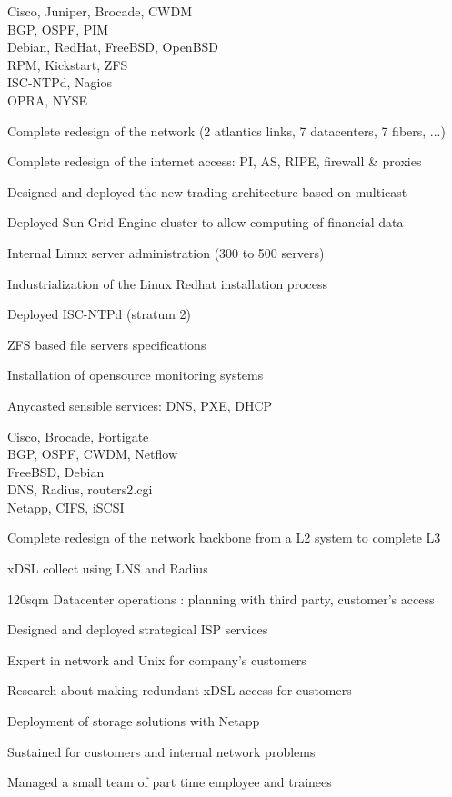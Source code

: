 \documentclass[a4paper,11pt]{cv4tw}%
\begin{document}
	{Cisco, Juniper, Brocade, CWDM\\BGP, OSPF, PIM\\Debian, RedHat, FreeBSD, OpenBSD\\RPM, Kickstart, ZFS\\ISC-NTPd, Nagios\\OPRA, NYSE}
		{
		\begin{missions}
			\item Complete redesign of the network (2 atlantics links, 7 datacenters, 7 fibers, ...)
			\item Complete redesign of the internet access: PI, AS, RIPE, firewall \& proxies
			\item Designed and deployed the new trading architecture based on multicast
			\item Deployed Sun Grid Engine cluster to allow computing of financial data 
			\item Internal Linux server administration (300 to 500 servers)
			\item Industrialization of the Linux Redhat installation process
			\item Deployed ISC-NTPd (stratum 2)
			\item ZFS based file servers specifications
			\item Installation of opensource monitoring systems 	
			\item Anycasted sensible services: DNS, PXE, DHCP
		\end{missions}
	}


	{Cisco, Brocade, Fortigate\\BGP, OSPF, CWDM, Netflow\\FreeBSD, Debian\\DNS, Radius, routers2.cgi\\Netapp, CIFS, iSCSI}
		{
		\begin{missions}
			\item Complete redesign of the network backbone from a L2 system to complete L3
			\item xDSL collect using LNS and Radius
			\item 120sqm Datacenter operations : planning with third party, customer's access
			\item Designed and deployed strategical ISP services
			\item Expert in network and Unix for company's customers
			\item Research about making redundant xDSL access for customers
			\item Deployment of storage solutions with Netapp
			\item Sustained for customers and internal network problems
			\item Managed a small team of part time employee and trainees
		\end{missions}
	}
\end{document}

